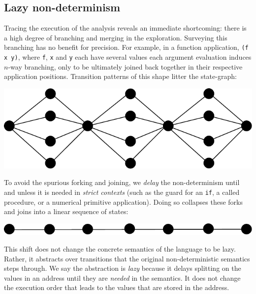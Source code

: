 \documentclass[preprint,onecolumn,9pt]{sigplanconf} %
\newtheorem{theorem}{Theorem}
\begin{document}


\subsection{Lazy non-determinism}

Tracing the execution of the analysis reveals an immediate shortcoming:
there is a high degree of branching and merging in the exploration.
%
Surveying this branching has no benefit for precision.
%
For example, in a function application, {\tt (f x y)},
where {\tt f}, {\tt x} and {\tt y} each have several values
each argument evaluation induces $n$-way branching, only to be ultimately joined back together in their respective
application positions.
%
Transition patterns of this shape litter the state-graph:
%
\begin{center}
\includegraphics[scale=0.3]{fanout}
\end{center}
To avoid the spurious forking and joining, we {\it delay} the non-determinism
until and unless it is needed in {\it strict contexts} (such as the guard for an
{\tt if}, a called procedure, or a numerical primitive application).
%
Doing so collapses these forks and joins into a linear sequence of states:
\begin{center}
\includegraphics[scale=0.3]{lazy}
\end{center}

This shift does not change the concrete semantics of the language to
be lazy.  Rather, it abstracts over transitions that the original
non-deterministic semantics steps through.
%
We say the abstraction is \emph{lazy} because it delays splitting on
the values in an address until they are \emph{needed} in the
semantics. It does not change the execution order that leads to the
values that are stored in the address.
\end{document}
